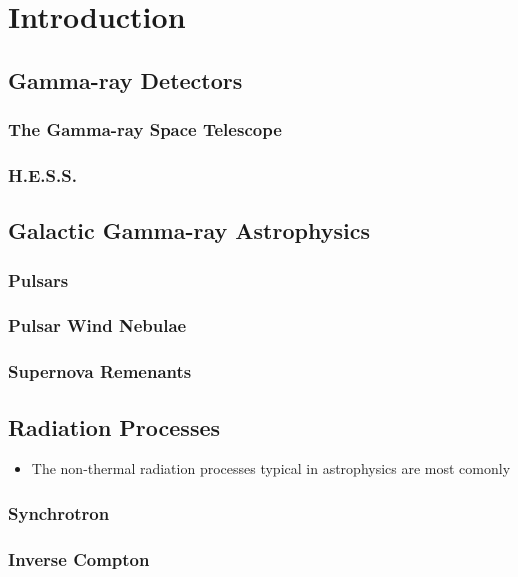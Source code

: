 
\chapter{Introduction}

\section{Gamma-ray Detectors}
\subsection{The \fermi Gamma-ray Space Telescope}
\subsection{H.E.S.S.}

\section{Galactic Gamma-ray Astrophysics}
\subsection{Pulsars}
\subsection{Pulsar Wind Nebulae}
\subsection{Supernova Remenants}

\section{Radiation Processes}

\begin{itemize}
  \item The non-thermal radiation processes typical
    in astrophysics are most comonly
\end{itemize}

\subsection{Synchrotron}

\subsection{Inverse Compton}

